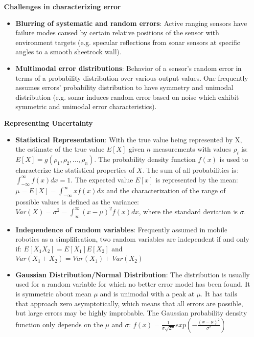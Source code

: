 \textbf{Challenges in characterizing error}
\begin{itemize}
    \item \textbf{Blurring of systematic and random errors}: Active ranging sensors have failure modes caused by certain relative positions of the sensor with environment targets (e.g. specular reflections from sonar sensors at specific angles to a smooth sheetrock wall).
    \item \textbf{Multimodal error distributions}: Behavior of a sensor's random error in terms of a probability distribution over various output values. One frequently assumes errors' probability distribution to have symmetry and unimodal distribution (e.g. sonar induces random error based on noise which exhibit symmetric and unimodal error characteristics).
\end{itemize}

\textbf{Representing Uncertainty}
\begin{itemize}
    \item \textbf{Statistical Representation}:
    With the true value being represented by X, the estimate of the true value  $E[X]$ given $n$ measurements with values $\rho_i$ is: $E[X]=g(\rho_1,\rho_2,...,\rho_n)$.
    The probability density function $f(x)$ is used to characterize the statistical properties of $X$. The sum of all probabilities is: $\int_{-\infty}^{\infty}f(x)dx=1$.
    The expected value $E[x]$ is represented by the mean: $\mu=E[X]=\int_{-\infty}^{\infty}xf(x)dx$ and the characterization of the range of possible values is defined as the variance: $Var(X)=\sigma^2=\int_{\infty}^{\infty}(x-\mu)^2f(x)dx$, where the standard deviation is $\sigma$.
    \item \textbf{Independence of random variables}:
    Frequently assumed in mobile robotics as a simplification, two random variables are independent if and only if: $E[X_1X_2]=E[X_1]E[X_2]$ and $Var(X_1+X_2)=Var(X_1)+Var(X_2)$
    \item \textbf{Gaussian Distribution/Normal Distribution}:
    The distribution is usually used for a random variable for which no better error model has been found. It is symmetric about mean $\mu$ and is unimodal with a peak at $\mu$. It has tails that approach zero asymptotically, which means that all errors are possible, but large errors may be highly improbable. The Gaussian probability density function only depends on the $\mu$ and $\sigma$: $f(x)=\frac{1}{\sigma\sqrt{2\pi}}exp\left(-\frac{\left(x-\mu\right)^2}{\sigma^2}\right)$

\end{itemize}

